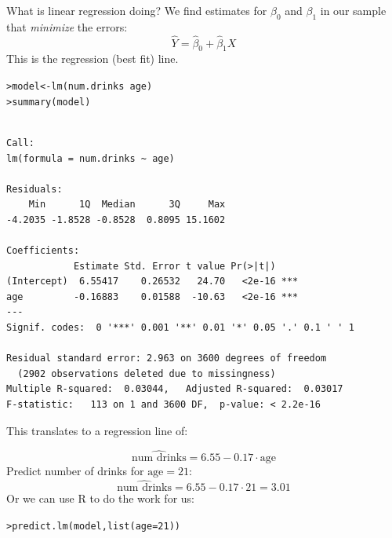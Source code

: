 \documentclass{beamer}\usepackage[]{graphicx}\usepackage[]{color}
\makeatletter
\newcommand{\hlnum}[1]{\textcolor[rgb]{0.824,0.412,0.118}{#1}}%
\newcommand{\hlopt}[1]{\textcolor[rgb]{1,0.894,0.769}{#1}}%
\newcommand{\hlstd}[1]{\textcolor[rgb]{1,0.894,0.769}{#1}}%
\newcommand{\hlkwb}[1]{\textcolor[rgb]{0.804,0.776,0.451}{#1}}%
\newcommand{\hlkwc}[1]{\textcolor[rgb]{0.78,0.941,0.545}{#1}}%
\newcommand{\hlkwd}[1]{\textcolor[rgb]{1,0.78,0.769}{#1}}%
\newenvironment{kframe}{%
 \def\at@end@of@kframe{}%
 \ifinner\ifhmode%
  \def\at@end@of@kframe{\end{minipage}}%
  \begin{minipage}{\columnwidth}%
 \fi\fi%
 \def\FrameCommand##1{\hskip\@totalleftmargin \hskip-\fboxsep
 \colorbox{shadecolor}{##1}\hskip-\fboxsep
     \hskip-\linewidth \hskip-\@totalleftmargin \hskip\columnwidth}%
 \MakeFramed {\advance\hsize-\width
   \@totalleftmargin\z@ \linewidth\hsize
   \@setminipage}}%
 {\par\unskip\endMakeFramed%
 \at@end@of@kframe}
\newenvironment{knitrout}{}{} %
\makeatother
\begin{document}
\begin{darkframes}
\begin{frame}{What is linear regression doing?}
      We find estimates for $\beta_0$ and $\beta_1$ in our sample that \emph{minimize} the errors:
      \[
        \hat Y = \hat\beta_0 + \hat\beta_1 X
      \]
      This is the regression (best fit) line.
    \end{frame}

    \begin{frame}[fragile]
      \fontsize{9}{9}\selectfont
\begin{knitrout}
\begin{kframe}
\begin{alltt}
\hlstd{> }\hlstd{model} \hlkwb{<-} \hlkwd{lm}\hlstd{(num.drinks} \hlopt{~} \hlstd{age)}
\hlstd{> }\hlkwd{summary}\hlstd{(model)}
\end{alltt}
\begin{verbatim}

Call:
lm(formula = num.drinks ~ age)

Residuals:
    Min      1Q  Median      3Q     Max 
-4.2035 -1.8528 -0.8528  0.8095 15.1602 

Coefficients:
            Estimate Std. Error t value Pr(>|t|)    
(Intercept)  6.55417    0.26532   24.70   <2e-16 ***
age         -0.16883    0.01588  -10.63   <2e-16 ***
---
Signif. codes:  0 '***' 0.001 '**' 0.01 '*' 0.05 '.' 0.1 ' ' 1

Residual standard error: 2.963 on 3600 degrees of freedom
  (2902 observations deleted due to missingness)
Multiple R-squared:  0.03044,	Adjusted R-squared:  0.03017 
F-statistic:   113 on 1 and 3600 DF,  p-value: < 2.2e-16
\end{verbatim}
\end{kframe}
\end{knitrout}
      \lc
    \end{frame}

    \begin{frame}[fragile]
      This translates to a regression line of:

      \[
        \widehat{\text{num drinks}} = 6.55 - 0.17 \cdot\text{age}
      \]
      \pause
      Predict number of drinks for $\text{age}=21$:
      \[
        \widehat{\text{num drinks}}
        = 6.55 - 0.17 \cdot 21
        = 3.01
      \]
      Or we can use R to do the work for us:
\begin{knitrout}
\begin{kframe}
\begin{alltt}
\hlstd{> }\hlkwd{predict.lm}\hlstd{(model,} \hlkwd{list}\hlstd{(}\hlkwc{age}\hlstd{=}\hlnum{21}\hlstd{))}
\end{alltt}
\end{kframe}
\end{knitrout}
      \lc
    \end{frame}


\end{darkframes}
\end{document}
